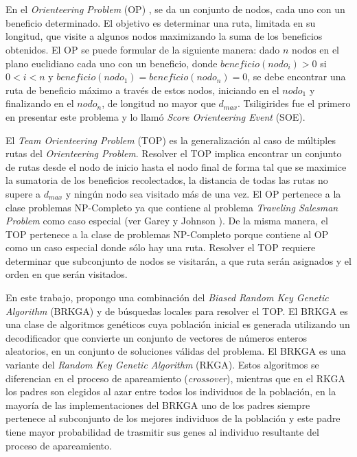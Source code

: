 
\chapter*{\tituloAbstractEs}

\noindent En el \textit{Orienteering Problem} (OP) \cite{Tsiligirides}, se da un conjunto de nodos, cada uno con un beneficio determinado. El objetivo es determinar una ruta, limitada en su longitud, que visite a algunos nodos maximizando la suma de los beneficios obtenidos. El OP se puede formular de la siguiente manera: dado $n$ nodos en el plano euclidiano cada uno con un beneficio, donde $beneficio(nodo_i) > 0$ si $0 < i < n$ y $beneficio(nodo_1) = beneficio(nodo_n) = 0$, se debe encontrar una ruta de beneficio máximo a través de estos nodos, iniciando en el $nodo_1$ y finalizando en el $nodo_n$, de longitud no mayor que $d_{max}$. Tsiligirides \cite{Tsiligirides} fue el primero en presentar este problema y lo llamó \textit{Score Orienteering Event} (SOE).

\bigskip

El \textit{Team Orienteering Problem} (TOP) \cite{ChaoGoldenWasil} es la generalización al caso de múltiples rutas del \textit{Orienteering Problem}. Resolver el TOP implica encontrar un conjunto de rutas desde el nodo de inicio hasta el nodo final de forma tal que se maximice la sumatoria de los beneficios recolectados, la distancia de todas las rutas no supere a $d_{max}$ y ningún nodo sea visitado más de una vez. El OP pertenece a la clase problemas NP-Completo ya que contiene al problema \textit{Traveling Salesman Problem} como caso especial (ver Garey y Johnson \cite{GareyJohnson}). De la misma manera, el TOP pertenece a la clase de problemas NP-Completo porque contiene al OP como un caso especial donde sólo hay una ruta. Resolver el TOP requiere determinar que subconjunto de nodos se visitarán, a que ruta serán asignados y el orden en que serán visitados.

\bigskip

En este trabajo, propongo una combinación del \textit{Biased Random Key Genetic Algorithm} (BRKGA) \cite{Bean} y de búsquedas locales para resolver el TOP. El BRKGA es una clase de algoritmos genéticos cuya población inicial es generada utilizando un decodificador que convierte un conjunto de vectores de números enteros aleatorios, en un conjunto de soluciones válidas del problema. El BRKGA es una variante del \textit{Random Key Genetic Algorithm} (RKGA). Estos algoritmos se diferencian en el proceso de apareamiento (\textit{crossover}), mientras que en el RKGA los padres son elegidos al azar entre todos los individuos de la población, en la mayoría de las implementaciones del BRKGA uno de los padres siempre pertenece al subconjunto de los mejores individuos de la población y este padre tiene mayor probabilidad de trasmitir sus genes al individuo resultante del proceso de apareamiento.

